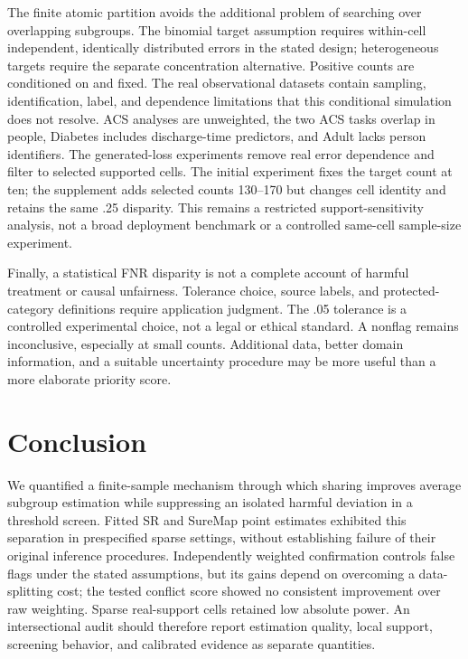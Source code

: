 \documentclass[Afour,sageh,times,doublespace]{sagej}
\newif\ifreviewcopy
\begin{document}
The finite atomic partition avoids the additional problem of searching over overlapping subgroups. The binomial target assumption requires within-cell independent, identically distributed errors in the stated design; heterogeneous targets require the separate concentration alternative. Positive counts are conditioned on and fixed. The real observational datasets contain sampling, identification, label, and dependence limitations that this conditional simulation does not resolve. ACS analyses are unweighted, the two ACS tasks overlap in people, Diabetes includes discharge-time predictors, and Adult lacks person identifiers. The generated-loss experiments remove real error dependence and filter to selected supported cells. The initial experiment fixes the target count at ten; the supplement adds selected counts 130--170 but changes cell identity and retains the same .25 disparity. This remains a restricted support-sensitivity analysis, not a broad deployment benchmark or a controlled same-cell sample-size experiment.

Finally, a statistical FNR disparity is not a complete account of harmful treatment or causal unfairness. Tolerance choice, source labels, and protected-category definitions require application judgment. The .05 tolerance is a controlled experimental choice, not a legal or ethical standard. A nonflag remains inconclusive, especially at small counts. Additional data, better domain information, and a suitable uncertainty procedure may be more useful than a more elaborate priority score.

\section{Conclusion}
We quantified a finite-sample mechanism through which sharing improves average subgroup estimation while suppressing an isolated harmful deviation in a threshold screen. Fitted SR and SureMap point estimates exhibited this separation in prespecified sparse settings, without establishing failure of their original inference procedures. Independently weighted confirmation controls false flags under the stated assumptions, but its gains depend on overcoming a data-splitting cost; the tested conflict score showed no consistent improvement over raw weighting. Sparse real-support cells retained low absolute power. An intersectional audit should therefore report estimation quality, local support, screening behavior, and calibrated evidence as separate quantities.

\ifreviewcopy\else
\end{document}
